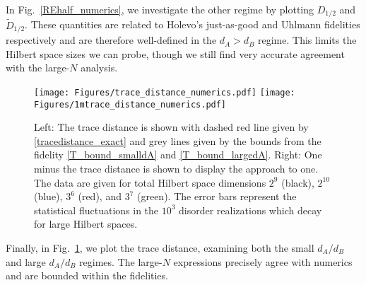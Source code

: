 \documentclass[a4paper,11pt]{article}
\begin{document}
In Fig.~\ref{REhalf_numerics}, we investigate the other regime by plotting $D_{1/2}$ and $\tilde{D}_{1/2}$. These quantities are related to Holevo's just-as-good and Uhlmann fidelities respectively and are therefore well-defined in the $d_A > d_B$ regime. This limits the Hilbert space sizes we can probe, though we still find very accurate agreement with the large-$N$ analysis.

\begin{figure}
    \centering
    \texttt{[image: Figures/trace\_distance\_numerics.pdf]}
    \texttt{[image: Figures/1mtrace\_distance\_numerics.pdf]}
    \caption{Left: The trace distance is shown with dashed red line given by \eqref{tracedistance_exact} and grey lines given by the bounds from the fidelity \eqref{T_bound_smalldA} and \eqref{T_bound_largedA}. Right: One minus the trace distance is shown to display the approach to one. The data are given for total Hilbert space dimensions $2^9$ (black), $2^{10}$ (blue), $3^6$ (red), and $3^7$ (green). The error bars represent the statistical fluctuations in the $10^3$ disorder realizations which decay for large Hilbert spaces.}
    \label{trace_distance_numerics}
\end{figure}

Finally, in Fig.~\ref{trace_distance_numerics}, we plot the trace distance, examining both the small $d_A/d_B$ and large $d_A/d_B$ regimes. The large-$N$ expressions precisely agree with numerics and are bounded within the fidelities.

\end{document}
